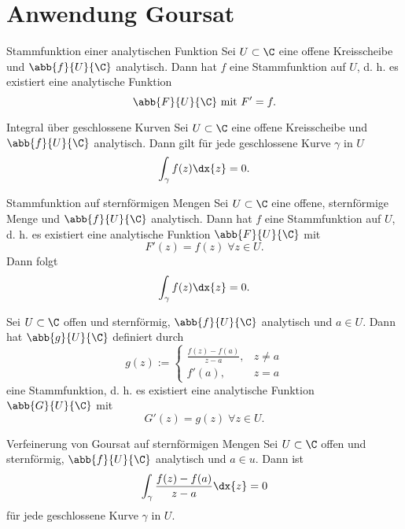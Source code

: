 \section{Anwendung Goursat}

\begin{karte}{Stammfunktion einer analytischen Funktion}
    Sei \(U \subset \C\) eine offene Kreisscheibe und \(\abb{f}{U}{\C}\) analytisch. Dann hat 
    \(f \) eine Stammfunktion auf \(U\), d. h. es existiert eine analytische Funktion 
    \[ \abb{F}{U}{\C} \text{ mit } F' = f. \]
\end{karte}

\begin{karte}{Integral über geschlossene Kurven}
    Sei \(U \subset \C\) eine offene Kreisscheibe und \(\abb{f}{U}{\C}\) analytisch. Dann gilt 
    für jede geschlossene Kurve \(\gamma\) in \(U\) 
    \[ \int_\gamma f(z) \dx{z} = 0. \]
\end{karte}

\begin{karte}{Stammfunktion auf sternförmigen Mengen}
    Sei \(U \subset \C\) eine offene, sternförmige Menge und 
    \(\abb{f}{U}{\C}\) analytisch. Dann hat \(f\) eine Stammfunktion 
    auf \(U\), d. h. es existiert eine analytische Funktion 
    \(\abb{F}{U}{\C}\) mit 
    \[ F'(z) = f(z) \;\forall z\in U. \]
    Dann folgt 
    \[ \int_\gamma f(z) \dx{z} = 0. \]
\end{karte}

\begin{karte}{}
    Sei \(U \subset \C\) offen und sternförmig, \(\abb{f}{U}{\C}\) analytisch und \(a\in U\). 
    Dann hat \(\abb{g}{U}{\C}\) definiert durch 
    \[ g(z) := \begin{cases}
        \frac{f(z) - f(a)}{z - a}, &z\neq a \\
        f'(a), & z = a
    \end{cases} \]
    eine Stammfunktion, d. h. es existiert eine analytische Funktion 
    \(\abb{G}{U}{\C}\) mit 
    \[ G'(z) = g(z) \;\forall z\in U. \]
\end{karte}

\begin{karte}{Verfeinerung von Goursat auf sternförmigen Mengen}
    Sei \(U \subset \C\) offen und sternförmig, \(\abb{f}{U}{\C}\) analytisch und \(a\in u\). 
    Dann ist 
    \[ \int_\gamma \frac{f(z) - f(a) }{z-a} \dx{z} = 0 \]
    für jede geschlossene Kurve \(\gamma\) in \(U\).
\end{karte}

